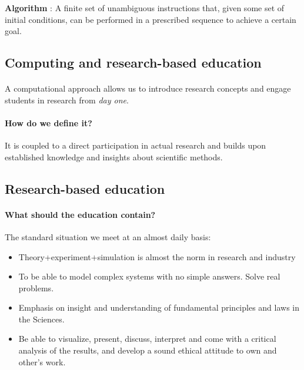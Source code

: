 \documentclass[%
oneside,                 %
final,                   %
10pt]{article}
\begin{document}
\noindent
\textbf{Algorithm} : A finite set of unambiguous instructions that, given some set of initial conditions, can be performed in a prescribed sequence to achieve a certain goal.





\subsection*{Computing and research-based education}

\paragraph{}
A computational approach allows us to introduce research concepts and engage students in research from \emph{day one}.



\paragraph{How do we define it?}
It is coupled to a direct participation in actual research and builds upon established
knowledge and insights about scientific methods.





\subsection*{Research-based education}

\paragraph{What should the education contain?}
The standard situation we meet at an almost daily basis:

\begin{itemize}
\item Theory+experiment+simulation is almost the norm in research and industry

\item To be able to model complex systems with no simple answers. Solve real problems.

\item Emphasis on insight and understanding of fundamental principles and laws in the Sciences.

\item Be able to visualize, present, discuss, interpret and come with a critical analysis of the results, and develop a sound ethical attitude to own and other's work.
\end{itemize}
\end{document}
